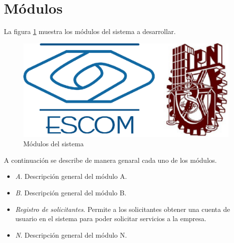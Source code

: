 
\section{Módulos}

	La figura \ref{modulos} muestra los módulos del sistema a desarrollar.

	\begin{figure}[h]
		
		\begin{center}

			\includegraphics[scale=0.35]{imagenes/modulos/ModulosSistema.jpg}
			\caption{Módulos del sistema}
			\label{modulos}
			
		\end{center}
		
	\end{figure}

	A continuación se describe de manera genaral cada uno de los módulos.

	\begin{itemize}

		\item \textit{A}. Descripción general del módulo A.
		\item \textit{B}. Descripción general del módulo B.
		\item \textit{Registro de solicitantes}. Permite a los solicitantes obtener una cuenta de usuario en el sistema para poder solicitar servicios a la empresa.
		\item \textit{N}. Descripción general del módulo N.

	\end{itemize}


